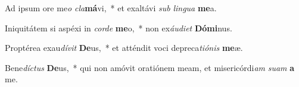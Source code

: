 \item Ad ipsum ore me\textit{o} \textit{cla}\textbf{má}vi,~* et exaltávi \textit{sub} \textit{lin}\textit{gua} \textbf{me}a.
\item Iniquitátem si aspéxi in \textit{cor}\textit{de} \textbf{me}o,~* non ex\textit{áu}\textit{di}\textit{et} \textbf{Dó}\textbf{mi}nus.
\item Proptérea exau\textit{dí}\textit{vit} \textbf{De}us,~* et atténdit voci depreca\textit{ti}\textit{ó}\textit{nis} \textbf{me}æ.
\item Bene\textit{díc}\textit{tus} \textbf{De}us,~* qui non amóvit oratiónem meam, et misericórdi\textit{am} \textit{su}\textit{am} \textbf{a} me.

